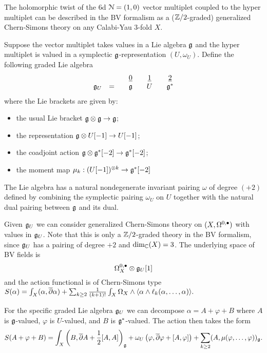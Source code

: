 \documentclass[10pt, oneside]{article}
\begin{document}
The holomorphic twist of the 6d $\mathcal N=(1,0)$ vector multiplet coupled to the hyper multiplet can be described in the BV formalism as a ($\mathbb Z/2$-graded) generalized Chern-Simons theory on any Calabi-Yau $3$-fold $X$. 

Suppose the vector multiplet takes values in a Lie algebra $\mathfrak g$ and the hyper multiplet is valued in a symplectic $\mathfrak g$-representation $(U,\omega_U)$. 
Define the following graded Lie algebra
\[
\begin{array}{ccccccccc}
&&& \underline{0}  & & \underline{1} & & \underline{2} \\
\mathfrak g_U & = && \mathfrak g & & U & & \mathfrak g^*
\end{array}
\]
where the Lie brackets are given by:
\begin{itemize}
\item the usual Lie bracket $\mathfrak g \otimes \mathfrak g \to \mathfrak g$;
\item the representation $\mathfrak g \otimes U[-1] \to U[-1]$;
\item the coadjoint action $\mathfrak g \otimes \mathfrak g^*[-2] \to \mathfrak g^*[-2]$;
\item the moment map $\mu_k : (U[-1])^{\otimes k} \to \mathfrak g^*[-2]$ 
\end{itemize}

The Lie algebra has a natural nondegenerate invariant pairing $\omega$ of degree $(+2)$ defined by combining the symplectic pairing $\omega_U$ on $U$ together with the natural dual pairing between $\mathfrak g$ and its dual. 

Given $\mathfrak g_U$ we can consider generalized Chern-Simons theory on $(X, \Omega^{0,\bullet})$ with values in $\mathfrak g_U$.
Note that this is only a $\mathbb Z/2$-graded theory in the BV formalism, since $\mathfrak g_U$ has a pairing of degree $+2$ and $\dim_\mathbb C (X) = 3$. 
The underlying space of BV fields is 
\[
\Omega^{0,\bullet}_X \otimes \mathfrak g_U [1]
\]
and the action functional is of Chern-Simons type $S(\alpha) = \int_X (\alpha, \overline{\partial} \alpha) + \sum_{k\geq 2}\frac{1}{(k+1)!} \int_{X} \Omega_X\wedge \langle \alpha \wedge \ell_k(\alpha, \dots, \alpha)\rangle.$

For the specific graded Lie algebra $\mathfrak g_U$ we can decompose $\alpha = A + \varphi + B$ where $A$ is $\mathfrak g$-valued, $\varphi$ is $U$-valued, and $B$ is $\mathfrak g^*$-valued.
The action then takes the form
\[
S(A + \varphi + B) = \int_X \left(B, \overline{\partial} A + \frac{1}{2} [A,A] \right)_\mathfrak g + \omega_U \left(\varphi, \overline{\partial} \varphi + [A, \varphi] \right) + \sum_{k\geq 2} (A, \mu(\varphi, \ldots, \varphi))_\mathfrak g .
\]
\end{document}

